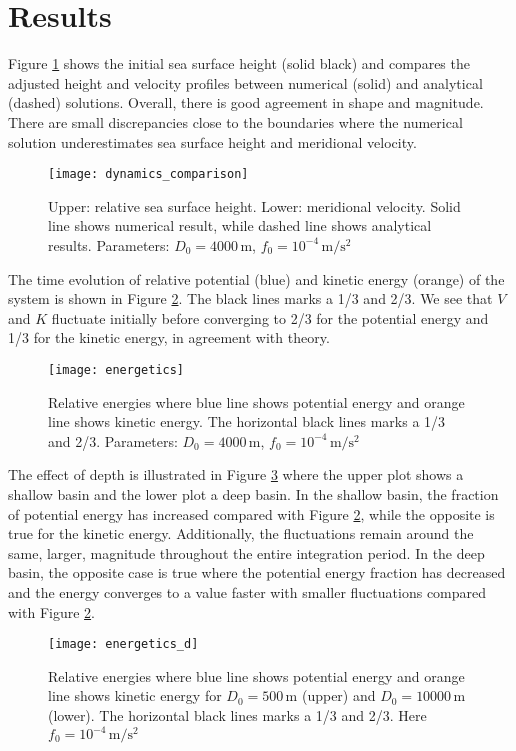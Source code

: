 \section{Results}
\label{sec:results}

Figure \ref{fig:dynamics} shows the initial sea surface height (solid black) and compares the adjusted height and velocity profiles between numerical (solid) and analytical (dashed) solutions. Overall, there is good agreement in shape and magnitude. There are small discrepancies close to the boundaries where the numerical solution underestimates sea surface height and meridional velocity.
	\begin{figure}[htbp]
		\centering
		\texttt{[image: dynamics\_comparison]}
		\caption{Upper: relative sea surface height. Lower: meridional velocity. Solid line shows numerical result, while dashed line shows analytical results. Parameters: $D_0=4000\,\text{m}$, $f_0=10^{-4}\,\text{m} / \text{s}^2$}
		\label{fig:dynamics}
	\end{figure}

The time evolution of relative potential (blue) and kinetic energy (orange) of the system is shown in Figure \ref{fig:energetics}. The black lines marks a 1/3 and 2/3. We see that $V$ and $K$ fluctuate initially before converging to 2/3 for the potential energy and 1/3 for the kinetic energy, in agreement with theory.
	\begin{figure}[htbp]
		\centering
		\texttt{[image: energetics]}
		\caption{Relative energies where blue line shows potential energy and orange line shows kinetic energy. The horizontal black lines marks a 1/3 and 2/3. Parameters: $D_0=4000\,\text{m}$, $f_0=10^{-4}\,\text{m} / \text{s}^2$}
		\label{fig:energetics}
	\end{figure}

The effect of depth is illustrated in Figure \ref{fig:energetics_d} where the upper plot shows a shallow basin and the lower plot a deep basin. In the shallow basin, the fraction of potential energy has increased compared with Figure \ref{fig:energetics}, while the opposite is true for the kinetic energy. Additionally, the fluctuations remain around the same, larger, magnitude throughout the entire integration period. In the deep basin, the opposite case is true where the potential energy fraction has decreased and the energy converges to a value faster with smaller fluctuations compared with Figure \ref{fig:energetics}.
	\begin{figure}[htbp]
		\centering
		\texttt{[image: energetics\_d]}
		\caption{Relative energies where blue line shows potential energy and orange line shows kinetic energy for $D_0 = 500 \,\text{m}$ (upper) and $D_0 = 10000\,\text{m}$ (lower). The horizontal black lines marks a 1/3 and 2/3. Here $f_0=10^{-4}\,\text{m} / \text{s}^2$}
		\label{fig:energetics_d}
	\end{figure}

